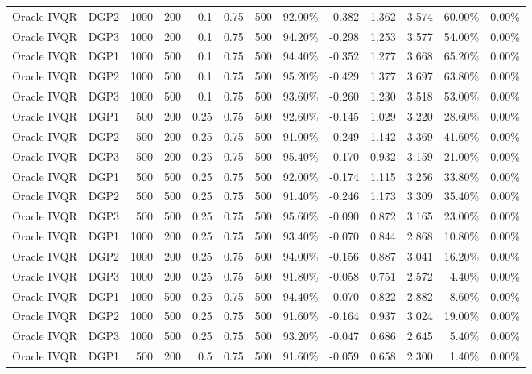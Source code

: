 \begin{landscape}
\begin{longtable}{llrrrrrrrrrrr}
Oracle IVQR & DGP2 & 1000 & 200 & 0.1 & 0.75 & 500 & 92.00\% & -0.382 & 1.362 & 3.574 & 60.00\% & 0.00\% \\
Oracle IVQR & DGP3 & 1000 & 200 & 0.1 & 0.75 & 500 & 94.20\% & -0.298 & 1.253 & 3.577 & 54.00\% & 0.00\% \\
Oracle IVQR & DGP1 & 1000 & 500 & 0.1 & 0.75 & 500 & 94.40\% & -0.352 & 1.277 & 3.668 & 65.20\% & 0.00\% \\
Oracle IVQR & DGP2 & 1000 & 500 & 0.1 & 0.75 & 500 & 95.20\% & -0.429 & 1.377 & 3.697 & 63.80\% & 0.00\% \\
Oracle IVQR & DGP3 & 1000 & 500 & 0.1 & 0.75 & 500 & 93.60\% & -0.260 & 1.230 & 3.518 & 53.00\% & 0.00\% \\
Oracle IVQR & DGP1 & 500 & 200 & 0.25 & 0.75 & 500 & 92.60\% & -0.145 & 1.029 & 3.220 & 28.60\% & 0.00\% \\
Oracle IVQR & DGP2 & 500 & 200 & 0.25 & 0.75 & 500 & 91.00\% & -0.249 & 1.142 & 3.369 & 41.60\% & 0.00\% \\
Oracle IVQR & DGP3 & 500 & 200 & 0.25 & 0.75 & 500 & 95.40\% & -0.170 & 0.932 & 3.159 & 21.00\% & 0.00\% \\
Oracle IVQR & DGP1 & 500 & 500 & 0.25 & 0.75 & 500 & 92.00\% & -0.174 & 1.115 & 3.256 & 33.80\% & 0.00\% \\
Oracle IVQR & DGP2 & 500 & 500 & 0.25 & 0.75 & 500 & 91.40\% & -0.246 & 1.173 & 3.309 & 35.40\% & 0.00\% \\
Oracle IVQR & DGP3 & 500 & 500 & 0.25 & 0.75 & 500 & 95.60\% & -0.090 & 0.872 & 3.165 & 23.00\% & 0.00\% \\
Oracle IVQR & DGP1 & 1000 & 200 & 0.25 & 0.75 & 500 & 93.40\% & -0.070 & 0.844 & 2.868 & 10.80\% & 0.00\% \\
Oracle IVQR & DGP2 & 1000 & 200 & 0.25 & 0.75 & 500 & 94.00\% & -0.156 & 0.887 & 3.041 & 16.20\% & 0.00\% \\
Oracle IVQR & DGP3 & 1000 & 200 & 0.25 & 0.75 & 500 & 91.80\% & -0.058 & 0.751 & 2.572 & 4.40\% & 0.00\% \\
Oracle IVQR & DGP1 & 1000 & 500 & 0.25 & 0.75 & 500 & 94.40\% & -0.070 & 0.822 & 2.882 & 8.60\% & 0.00\% \\
Oracle IVQR & DGP2 & 1000 & 500 & 0.25 & 0.75 & 500 & 91.60\% & -0.164 & 0.937 & 3.024 & 19.00\% & 0.00\% \\
Oracle IVQR & DGP3 & 1000 & 500 & 0.25 & 0.75 & 500 & 93.20\% & -0.047 & 0.686 & 2.645 & 5.40\% & 0.00\% \\
Oracle IVQR & DGP1 & 500 & 200 & 0.5 & 0.75 & 500 & 91.60\% & -0.059 & 0.658 & 2.300 & 1.40\% & 0.00\% \\

\end{longtable}
\end{landscape}
